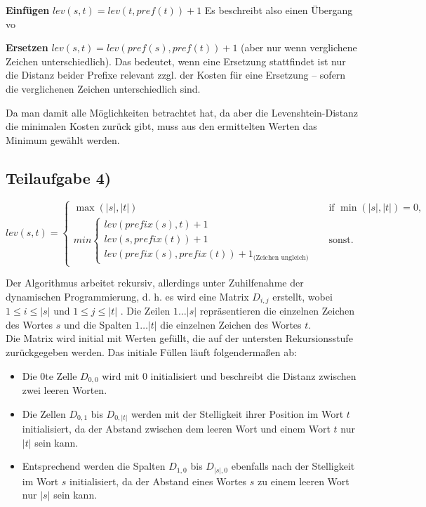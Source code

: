\documentclass[a4paper, fontsize=10pt]{scrartcl}
\begin{document}
\textbf{Einfügen}\smallskip
$lev(s,t)=lev(t,pref(t))+1$
Es beschreibt also einen Übergang vo

\bigskip

\textbf{Ersetzen}\smallskip
$lev(s,t)=lev(pref(s),pref(t))+1$ (aber nur wenn verglichene Zeichen unterschiedlich). Das bedeutet, wenn eine Ersetzung stattfindet ist nur die Distanz beider Prefixe relevant zzgl. der Kosten für eine Ersetzung -- sofern die verglichenen Zeichen unterschiedlich sind.\bigskip

Da man damit alle Möglichkeiten betrachtet hat, da aber die Levenshtein-Distanz die minimalen Kosten zurück gibt, muss aus den ermittelten Werten das Minimum gewählt werden.

\subsection*{Teilaufgabe 4)}

$lev(s,t) = \begin{cases}

\max(|s|,|t|) &\textrm{if $\min(|s|,|t|)=0$},\\
    min \begin{cases}
        lev(prefix(s),t)+1 & \\
        lev(s,prefix(t))+1 & \\
        lev(prefix(s),prefix(t)) + 1_{\textrm{(Zeichen ungleich)}}
        
        \end{cases} & \textrm{sonst.}
        
  \end{cases}      $

Der Algorithmus arbeitet rekursiv, allerdings unter Zuhilfenahme der dynamischen Programmierung, d. h. es wird eine Matrix $D_{i,j}$ erstellt, wobei 
$1\leq i\leq |s|$ und $1\leq j \leq |t|$ . Die Zeilen $1\dots |s|$ repräsentieren die einzelnen Zeichen des Wortes $s$ und die Spalten $1\dots |t|$ die einzelnen Zeichen des Wortes $t$. \\

Die Matrix wird initial mit Werten gefüllt, die auf der untersten Rekursionsstufe zurückgegeben werden. Das initiale Füllen läuft folgendermaßen ab:

\begin{itemize}
  \item Die 0te Zelle  $D_{0,0}$ wird mit $0$ initialisiert und beschreibt die Distanz zwischen zwei leeren Worten. 
  \item Die Zellen $D_{0,1}$ bis $D_{0,|t|}$ werden mit der Stelligkeit ihrer Position im Wort $t$ initialisiert, da der Abstand zwischen dem leeren Wort und einem Wort $t$ nur $|t|$ sein kann.
  \item Entsprechend werden die Spalten $D_{1,0}$ bis $D_{|s|,0}$ ebenfalls nach der Stelligkeit im Wort $s$ initialisiert, da der Abstand eines Wortes $s$ zu einem leeren Wort nur $|s|$ sein kann.
\end{itemize}
\end{document}
